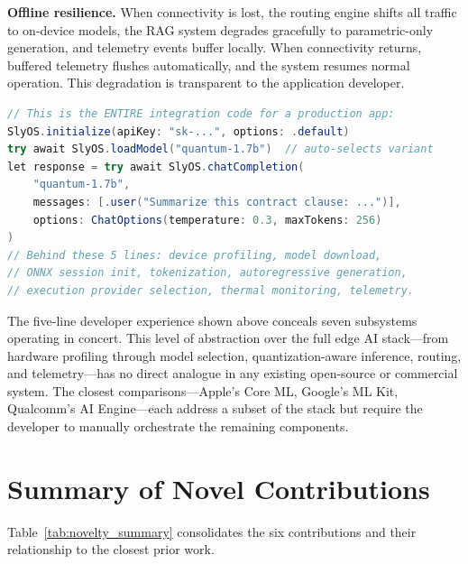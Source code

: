 \documentclass[12pt, letterpaper, twoside]{report}
\begin{document}
\textbf{Offline resilience.} When connectivity is lost, the routing engine shifts all traffic to on-device models, the RAG system degrades gracefully to parametric-only generation, and telemetry events buffer locally. When connectivity returns, buffered telemetry flushes automatically, and the system resumes normal operation. This degradation is transparent to the application developer.

\begin{lstlisting}[language=Java, caption={Complete developer experience---five lines for production-grade edge AI}]
// This is the ENTIRE integration code for a production app:
SlyOS.initialize(apiKey: "sk-...", options: .default)
try await SlyOS.loadModel("quantum-1.7b")  // auto-selects variant
let response = try await SlyOS.chatCompletion(
    "quantum-1.7b",
    messages: [.user("Summarize this contract clause: ...")],
    options: ChatOptions(temperature: 0.3, maxTokens: 256)
)
// Behind these 5 lines: device profiling, model download,
// ONNX session init, tokenization, autoregressive generation,
// execution provider selection, thermal monitoring, telemetry.
\end{lstlisting}

The five-line developer experience shown above conceals seven subsystems operating in concert. This level of abstraction over the full edge AI stack---from hardware profiling through model selection, quantization-aware inference, routing, and telemetry---has no direct analogue in any existing open-source or commercial system. The closest comparisons---Apple's Core ML, Google's ML Kit, Qualcomm's AI Engine---each address a subset of the stack but require the developer to manually orchestrate the remaining components.

\section{Summary of Novel Contributions}
\label{sec:novelty_summary}

Table~\ref{tab:novelty_summary} consolidates the six contributions and their relationship to the closest prior work.
\end{document}
